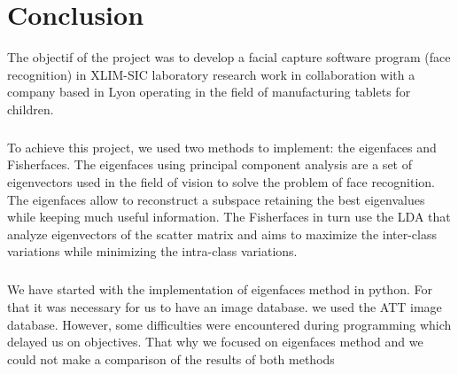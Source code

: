 \chapter*{Conclusion}

The objectif of the project was to develop a facial capture software program (face recognition) in XLIM-SIC laboratory research work in collaboration with a company based in Lyon operating in the field of manufacturing tablets for children.
\paragraph{}
To achieve this project, we used two methods to implement: the eigenfaces and Fisherfaces.
The eigenfaces using principal component analysis are a set of eigenvectors used in the field of vision to solve the problem of face recognition. The eigenfaces allow  to reconstruct a subspace retaining the best eigenvalues while keeping much useful information.
The Fisherfaces in turn use the LDA that analyze eigenvectors of the scatter matrix and aims to maximize the inter-class variations while minimizing the intra-class variations.
\paragraph{}
We have started with the implementation of  eigenfaces method in python. For that it was necessary for us to  have an image database. we used the ATT image database. However, some difficulties were encountered during programming which delayed us on objectives. That  why we focused on eigenfaces method and we could not make a comparison of the results of both methods




